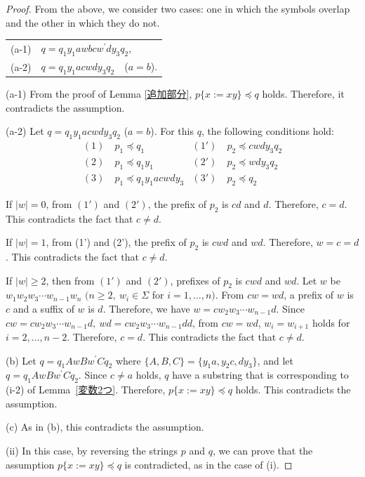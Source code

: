 \begin{proof}
From the above, we consider two cases: one in which the symbols overlap and the other in which they do not.
\smallskip

\begin{tabular}{cl}
\textrm{(a-1)} & $q=q_{1}y_{1}awbcw^{\prime}dy_{3}q_{2}$,\\
\textrm{(a-2)} & $q=q_{1}y_{1}acwdy_{3}q_{2}$~~($a=b$).
\end{tabular}
\smallskip

\textrm{(a-1)}
From the proof of Lemma \ref{追加部分}, $p \{ x:= xy \} \preceq q$ holds.
Therefore, it contradicts the assumption.

\textrm{(a-2)}
Let $q=q_{1}y_{1}acwdy_{3}q_{2}$ ($a=b$).
For this $q$, the following conditions hold:
\begin{align*}
(1)~& p_{1} \preceq q_{1} & (1')~& p_{2} \preceq cwdy_{3}q_{2} \\
(2)~& p_{1} \preceq q_{1}y_{1} & (2')~& p_{2} \preceq wdy_{3}q_{2} \\
(3)~& p_{1} \preceq q_{1}y_{1}acwdy_{3} & (3')~& p_{2} \preceq q_{2}
\end{align*}

%
If $|w|=0$, from $(1')$ and $(2')$, the prefix of $p_{2}$ is $cd$ and $d$.
Therefore, $c=d$. This contradicts the fact that $c \not = d$.

If $|w|=1$, from (1') and (2'), the prefix of $p_{2}$ is $cwd$ and $wd$.
Therefore, $w=c=d$.
This contradicts the fact that $c \not = d$.

If $|w| \ge 2$, then from $(1')$ and $(2')$,  prefixes of $p_{2}$ is $cwd$ and $wd$.
Let $w$ be $w_{1}w_{2}w_{3} \cdots w_{n-1}w_{n}$ $(n\geq 2,~w_{i}\in\Sigma$ for $i=1, \ldots , n)$.
From $cw=wd$, a prefix of $w$ is $c$ and a suffix of $w$ is $d$.
Therefore, we have $w=cw_{2}w_{3} \cdots w_{n-1}d$.
Since $cw=cw_{2}w_{3} \cdots w_{n-1}d,~wd=cw_{2}w_{3} \cdots w_{n-1}dd$, from $cw=wd$, $w_{i}=w_{i+1}$ holds for $i=2, \ldots , n-2$.
Therefore, $c=d$. This contradicts the fact that $c \not = d$.

\textrm{(b)}
Let $q=q_{1}AwBw^{\prime}Cq_{2}$ where $\{ A,B,C \} = \{ y_{1}a,y_{2}c,dy_{3} \}$, and let $q=q_{1}AwBw^{\prime}Cq_{2}$.
Since $c \not = a$ holds, $q$ have a substring that is corresponding to (i-2) of Lemma~\ref{変数2つ}.
Therefore, $p \{ x:= xy \} \preceq q$ holds.
This contradicts the assumption. 

\textrm{(c)} As in (b), this contradicts the assumption.

\noindent\textrm{(ii)}
In this case, by reversing the strings $p$ and $q$, we can prove that the assumption $p \{ x := xy \} \preceq q$ is contradicted, as in the case of \textrm{(i)}.
\end{proof}

